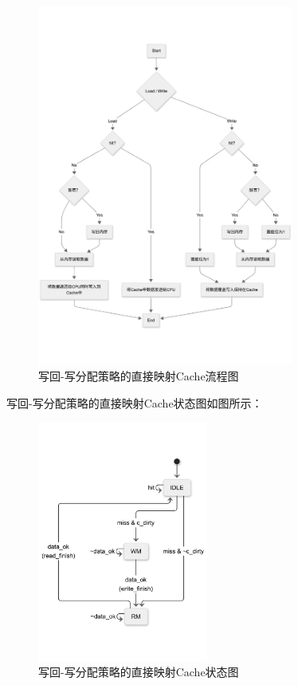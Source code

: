 \begin{figure}[H]
    \centering
    \includegraphics[width=0.75\textwidth]{image/fc.pdf}
    \caption{写回-写分配策略的直接映射Cache流程图}\label{cache_fc}
\end{figure}
写回-写分配策略的直接映射Cache状态图如图所示：
\begin{figure}[H]
    \centering
    \includegraphics[width=0.5\textwidth]{image/stat.pdf}
    \caption{写回-写分配策略的直接映射Cache状态图}\label{cache_stat}
\end{figure}
